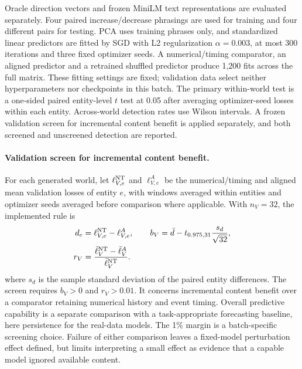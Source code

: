 Oracle direction vectors and frozen MiniLM text representations are evaluated separately. Four paired increase/decrease phrasings are used for training and four different pairs for testing. PCA uses training phrases only, and standardized linear predictors are fitted by SGD with L2 regularization $\alpha=0.003$, at most 300 iterations and three fixed optimizer seeds. A numerical/timing comparator, an aligned predictor and a retrained shuffled predictor produce 1,200 fits across the full matrix. These fitting settings are fixed; validation data select neither hyperparameters nor checkpoints in this batch. The primary within-world test is a one-sided paired entity-level $t$ test at 0.05 after averaging optimizer-seed losses within each entity. Across-world detection rates use Wilson intervals. A frozen validation screen for incremental content benefit is applied separately, and both screened and unscreened detection are reported.

\paragraph{Validation screen for incremental content benefit.}
For each generated world, let $\ell^{\rm NT}_{V,e}$ and $\ell^A_{V,e}$ be the numerical/timing and aligned mean validation losses of entity $e$, with windows averaged within entities and optimizer seeds averaged before comparison where applicable. With $n_V=32$, the implemented rule is
\begin{equation}
 \begin{aligned}
 d_e&=\ell^{\rm NT}_{V,e}-\ell^A_{V,e},\qquad
 b_V=\bar d-t_{0.975,31}\frac{s_d}{\sqrt{32}},\\
 r_V&=\frac{\bar\ell^{\rm NT}_V-\bar\ell^A_V}{\bar\ell^{\rm NT}_V}.
 \end{aligned}
 \label{eq:validation_content_screen}
\end{equation}
where $s_d$ is the sample standard deviation of the paired entity differences. The screen requires $b_V>0$ and $r_V>0.01$. It concerns incremental content benefit over a comparator retaining numerical history and event timing. Overall predictive capability is a separate comparison with a task-appropriate forecasting baseline, here persistence for the real-data models. The 1\% margin is a batch-specific screening choice. Failure of either comparison leaves a fixed-model perturbation effect defined, but limits interpreting a small effect as evidence that a capable model ignored available content.

